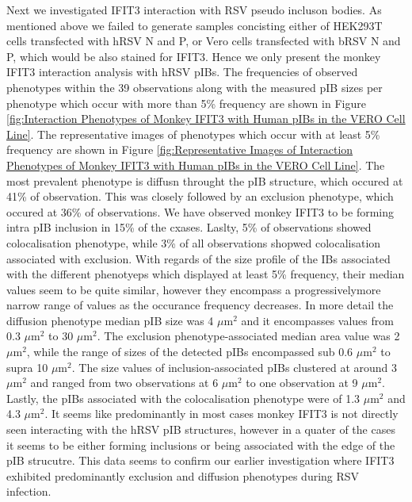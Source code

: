 Next we investigated IFIT3 interaction with RSV pseudo incluson bodies. As mentioned above we failed to generate samples concisting either of HEK293T cells transfected with hRSV N and P, or Vero cells transfected with bRSV N and P, which would be also stained for IFIT3. Hence we only present the monkey IFIT3 interaction analysis with hRSV pIBs. The frequencies of observed phenotypes within the 39 observations along with the measured pIB sizes per phenotype which occur with more than 5\% frequency are shown in Figure \ref{fig:Interaction Phenotypes of Monkey IFIT3 with Human pIBs in the VERO Cell Line}. The representative images of phenotypes which occur with at  least 5\% frequency are shown in Figure \ref{fig:Representative Images of Interaction Phenotypes of Monkey IFIT3 with Human pIBs in the VERO Cell Line}. The most prevalent phenotype is diffusn throught the pIB structure, which occured at 41\% of observation. This was closely followed by an exclusion phenotype, which occured at 36\% of observations. We have observed monkey IFIT3 to be forming intra pIB inclusion in 15\% of the cxases. Laslty, 5\% of observations showed colocalisation phenotype, while 3\% of all observations shopwed colocalisation associated with exclusion. With regards of the size profile of the IBs associated with the different phenotyeps which displayed at least 5\% frequency, their median values seem to be quite similar, however they encompass a progressivelymore narrow range of values as the occurance frequency decreases. In more detail the diffusion phenotype median pIB size was 4 \(\mu \mbox{m}^2\) and it encompasses values from 0.3 \(\mu \mbox{m}^2\) to 30 \(\mu \mbox{m}^2\). The exclusion phenotype-associated median area value was 2 \(\mu \mbox{m}^2\), while the range of sizes of the detected pIBs encompassed sub 0.6 \(\mu \mbox{m}^2\) to supra 10 \(\mu \mbox{m}^2\). The size values of inclusion-associated pIBs clustered at around 3 \(\mu \mbox{m}^2\) and ranged from two observations at 6 \(\mu \mbox{m}^2\) to one observation at 9 \(\mu \mbox{m}^2\). Lastly, the pIBs associated with the colocalisation phenotype were of 1.3 \(\mu \mbox{m}^2\) and 4.3 \(\mu \mbox{m}^2\). It seems like predominantly in most cases monkey IFIT3 is not directly seen interacting with the hRSV pIB structures, however in a quater of the cases it seems to be either forming inclusions or being associated with the edge of the pIB strucutre. This data seems to confirm our earlier investigation where IFIT3 exhibited predominantly exclusion and diffusion phenotypes during RSV infection.

